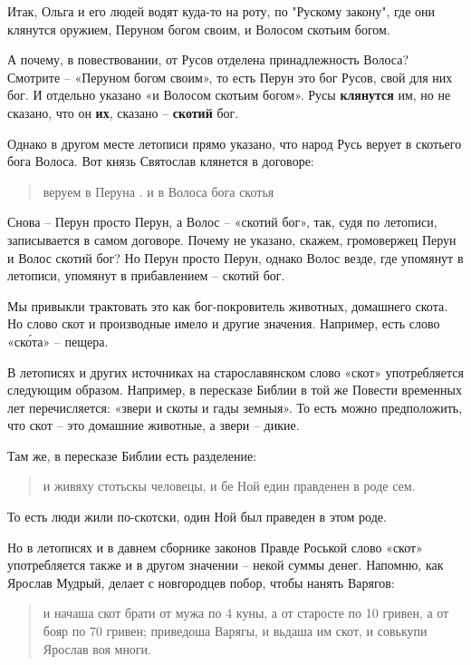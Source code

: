 \documentclass[a5paper,11pt,openany]{article}
\begin{document}
Итак, Ольга и его людей водят куда-то на роту, по "Рускому закону", где они клянутся оружием, Перуном богом своим, и Волосом скотьим богом. 

 А почему, в повествовании, от Русов отделена принадлежность Волоса? Смотрите – «Перуном богом своим», то есть Перун это бог Русов, свой для них бог. И отдельно указано «и Волосом скотьим богом». Русы \textbf{клянутся} им, но не сказано, что он \textbf{их}, сказано – \textbf{скотий} бог.

Однако в другом месте летописи прямо указано, что народ Русь верует в скотьего бога Волоса. Вот князь Святослав клянется в договоре:

\begin{quotation}
веруем в Перуна . и в Волоса бога скотья
\end{quotation}

 Снова – Перун просто Перун, а Волос – «скотий бог», так, судя по летописи, записывается в самом договоре. Почему не указано, скажем, громовержец Перун и Волос скотий бог? Но Перун просто Перун, однако Волос везде, где упомянут в летописи, упомянут в прибавлением – скотий бог.


  Мы привыкли трактовать это как бог-покровитель животных, домашнего скота. Но слово скот и производные имело и другие значения. Например, есть слово «ск\'ота» – пещера.

  В летописях и других источниках на старославянском слово «скот» употребляется следующим образом. Например, в пересказе Библии в той же Повести временных лет перечисляется: «звери и скоты и гады земныя». То есть можно предположить, что скот – это домашние животные, а звери – дикие.

Там же, в пересказе Библии есть разделение:

\begin{quotation}
\noindent и живяху стотьскы человецы, и бе Ной един правденен в роде сем.
\end{quotation}

   То есть люди жили по-скотски, один Ной был праведен в этом роде.

Но в летописях и в давнем сборнике законов Правде Роськой слово «скот» употребляется также и в другом значении – некой суммы денег. Напомню, как Ярослав Мудрый, делает с новгородцев побор, чтобы нанять Варягов:

\begin{quotation}
и начаша скот брати от мужа по 4 куны,
а от старосте по 10 гривен, а от бояр по 70
гривен; приведоша Варягы, и вьдаша им скот, и совькупи Ярослав воя многи.
\end{quotation}
\end{document}

